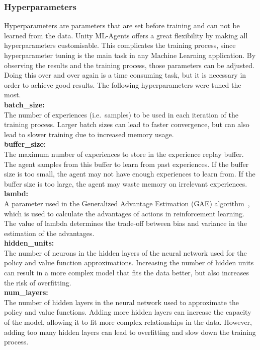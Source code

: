 \subsubsection{Hyperparameters}
Hyperparameters are parameters that are set before training and can not be learned from the data.
Unity ML-Agents offers a great flexibility by making all hyperparameters customisable.
This complicates the training process, since hyperparameter tuning is the main task in any Machine Learning application.
By observing the results and the training process, those parameters can be adjusted.
Doing this over and over again is a time consuming task, but it is necessary in order to achieve good results.
The following hyperparameters were tuned the most.\\
\textbf{batch\_size:}\\
The number of experiences (i.e.\ samples) to be used in each iteration of the training process.
Larger batch sizes can lead to faster convergence, but can also lead to slower training due to increased memory usage.\\
\textbf{buffer\_size:}\\
The maximum number of experiences to store in the experience replay buffer.
The agent samples from this buffer to learn from past experiences.
If the buffer size is too small, the agent may not have enough experiences to learn from.
If the buffer size is too large, the agent may waste memory on irrelevant experiences.\\
\textbf{lambd:}\\
A parameter used in the Generalized Advantage Estimation (GAE) algorithm~\cite{schulman_high-dimensional_2015}, which is used to calculate the advantages of actions in reinforcement learning.
The value of lambda determines the trade-off between bias and variance in the estimation of the advantages.\\
\textbf{hidden\_units:}\\
The number of neurons in the hidden layers of the neural network used for the policy and value function approximations.
Increasing the number of hidden units can result in a more complex model that fits the data better, but also increases the risk of overfitting.\\
\textbf{num\_layers:}\\
The number of hidden layers in the neural network used to approximate the policy and value functions.
Adding more hidden layers can increase the capacity of the model, allowing it to fit more complex relationships in the data.
However, adding too many hidden layers can lead to overfitting and slow down the training process.\\

